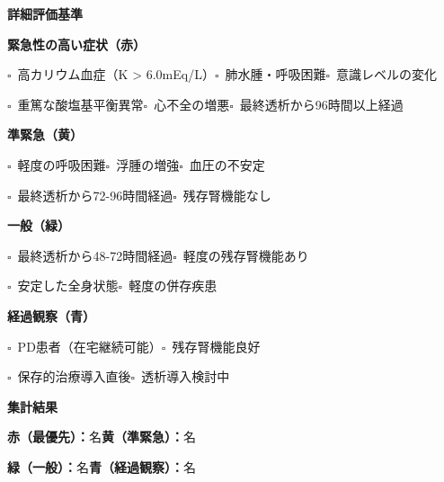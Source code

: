 \documentclass[a4paper,12pt]{jarticle}
\newcommand{\checkbox}{$\square$\ }
\newcommand{\underlinespace}[1]{\underline{\hspace{#1}}}
\begin{document}
\vspace{5mm}

\begin{center}
\textbf{\large 詳細評価基準}
\end{center}

\vspace{3mm}

\noindent
\textbf{緊急性の高い症状（赤）}

\noindent
\checkbox 高カリウム血症（K > 6.0mEq/L）\quad \checkbox 肺水腫・呼吸困難\quad \checkbox 意識レベルの変化

\noindent
\checkbox 重篤な酸塩基平衡異常\quad \checkbox 心不全の増悪\quad \checkbox 最終透析から96時間以上経過

\vspace{3mm}

\noindent
\textbf{準緊急（黄）}

\noindent
\checkbox 軽度の呼吸困難\quad \checkbox 浮腫の増強\quad \checkbox 血圧の不安定

\noindent
\checkbox 最終透析から72-96時間経過\quad \checkbox 残存腎機能なし

\vspace{3mm}

\noindent
\textbf{一般（緑）}

\noindent
\checkbox 最終透析から48-72時間経過\quad \checkbox 軽度の残存腎機能あり

\noindent
\checkbox 安定した全身状態\quad \checkbox 軽度の併存疾患

\vspace{3mm}

\noindent
\textbf{経過観察（青）}

\noindent
\checkbox PD患者（在宅継続可能）\quad \checkbox 残存腎機能良好

\noindent
\checkbox 保存的治療導入直後\quad \checkbox 透析導入検討中

\vspace{8mm}

\begin{center}
\textbf{\large 集計結果}
\end{center}

\vspace{3mm}

\noindent
\textbf{赤（最優先）：}\underlinespace{2cm}名\quad \textbf{黄（準緊急）：}\underlinespace{2cm}名

\vspace{2mm}

\noindent
\textbf{緑（一般）：}\underlinespace{2cm}名\quad \textbf{青（経過観察）：}\underlinespace{2cm}名
\end{document}
